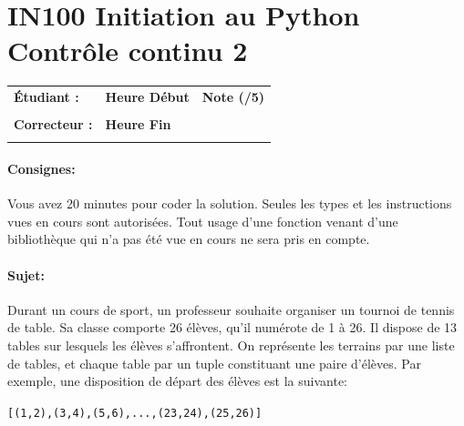 \documentclass[a4paper,11pt]{article}
\begin{document}
\newtheorem{theo}{Theorem}
\newtheorem{coro}{Corollary}[theo]
\newtheorem{lemme}{Lemma}
\renewcommand{\thecoro}{\thetheo.\arabic{coro}}



\parindent=0cm


\section*{\center IN100 Initiation au Python\\
Contrôle continu 2}

\vspace{-0.3 cm}

\begin{table}[h!]
\centering
\renewcommand{\arraystretch}{1.4} %
\begin{tabular}{|p{10cm}|p{3cm}|p{2cm}|}
\hline
\textbf{Étudiant :} & \textbf{Heure Début }  & \textbf{Note (/5) }  \\
& & \\
\hline
\textbf{Correcteur :} & \textbf{Heure Fin } & \\
& & \\
\hline

\hline
\end{tabular}
\end{table}
\vspace{-0.4 cm}
\paragraph*{Consignes:} Vous avez 20 minutes pour coder la solution. Seules les types et les instructions vues en cours sont autorisées. Tout usage d'une fonction 
venant d'une bibliothèque qui n'a pas été vue en cours ne sera pris en compte. 

\vspace{-0.2 cm}
\paragraph*{Sujet:}

Durant un cours de sport, un professeur souhaite organiser un tournoi de tennis de table. Sa classe comporte 26 élèves, qu'il numérote de 1 à 26. Il dispose de 13 tables sur lesquels les élèves s'affrontent. On représente les terrains par une liste de tables, et chaque table par un tuple constituant une paire d'élèves. Par exemple, une disposition de départ des élèves est la suivante: 
\begin{center}
	\texttt{[(1,2),(3,4),(5,6),...,(23,24),(25,26)]}
\end{center}
\end{document}
